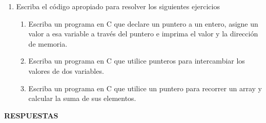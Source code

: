 \documentclass[12pt]{article}
\begin{document}
\begin{titlepage}
\begin{enumerate}
            \item Escriba el código apropiado para resolver los siguientes ejercicios
                \begin{enumerate}[label=\alph*)]
                    \item Escriba un programa en C que declare un puntero a un entero, asigne un valor a esa variable a través del puntero e imprima el valor y la dirección de memoria.
                    \item Escriba un programa en C que utilice punteros para intercambiar los valores de dos variables.
                    \item Escriba un programa en C que utilice un puntero para recorrer un array y calcular la suma de sus elementos.
                \end{enumerate}
        \end{enumerate}
    \end{titlepage}

    \newpage
        \begin{center}
            \textbf{RESPUESTAS}
        \end{center}
\end{document}
